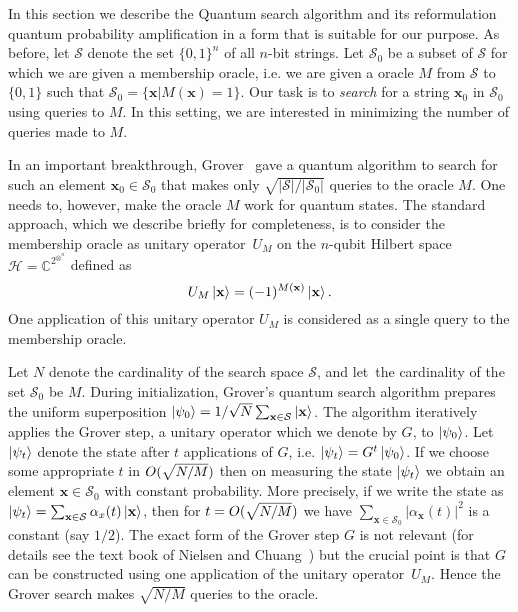 In this section we describe the Quantum search algorithm and its reformulation quantum probability amplification in a form that is suitable for our purpose. As before, let $\mathcal{S}$ denote the set $\{ 0, 1 \}^n$ of all $n$-bit strings. Let $\mathcal{S}_0$ be a subset of $\mathcal{S}$ for which we are given a membership oracle, i.e. we are given a oracle $M$ from $\mathcal{S}$ to $\{ 0 , 1 \}$ such that $\mathcal{S}_0 = \{ \mathbf{x} | M(\mathbf{x}) = 1 \}$. Our task is to \emph{search} for a string $\mathbf{x}_0$ in $\mathcal{S}_0$ using queries to $M$. In this setting, we are interested in minimizing the number of queries made to $M$.

In an important breakthrough, Grover~\cite{Grover96} gave a quantum algorithm to search for such an element $\mathbf{x}_0 \in \mathcal{S}_0$ that makes only $\sqrt{|\mathcal{S}|/|\mathcal{S}_0|}$ queries to the oracle $M$. One needs to, however, make the oracle $M$ work for quantum states. The standard approach, which we describe briefly for completeness, is to consider the membership oracle as unitary operator~$U_M$ on the $n$-qubit Hilbert space $\mathcal{H}= \mathbb{C}^{2^{\otimes^n}}$ defined as
\[
U_M \left\vert \mathbf{x} \right\rangle = (-1)^{M(\mathbf{x})} \left\vert \mathbf{x} \right\rangle.
\]
One application of this unitary operator $U_M$ is considered as a single query to the membership oracle.

Let $N$ denote the cardinality of the search space $\mathcal{S}$, and let~the cardinality of the set $\mathcal{S}_0$ be $M$. During initialization, Grover's quantum search algorithm prepares the uniform superposition $\left\vert \psi_0 \right\rangle= {1}/{\sqrt{N}}\sum_{\mathbf{x} \in \mathcal{S}}\left\vert \mathbf{x} \right\rangle$. The algorithm iteratively applies the Grover step, a unitary operator which we denote by $G$, to $\left\vert \psi_0 \right\rangle$.  Let $\left\vert \psi_t \right\rangle$ denote the state after $t$ applications of $G$, i.e. $\left\vert \psi_t \right\rangle = G^t \left\vert \psi_0 \right\rangle$. If we choose some appropriate $t$ in $ {O}(\sqrt{N/M})$ then on measuring the state $\left\vert \psi_t \right\rangle$ we obtain an element $\mathbf{x} \in \mathcal{S}_0$ with constant probability. More precisely, if we write the state as $\left\vert \psi_t \right\rangle = \sum_{\mathbf{x}\in \mathcal{S}} \alpha_x(t)\left\vert \mathbf{x} \right\rangle$, then for $t= {O}(\sqrt{N/M})$ we have $\sum_{\mathbf{x}\in\mathcal{S}_0} |\alpha_\mathbf{x}(t)|^2$ is a constant (say $1/2$). The exact form of the Grover step $G$ is not relevant (for details see the text book of Nielsen and Chuang~\cite[Chapter 6]{nielsenchuang:book}) but the crucial point is that $G$ can be constructed using one application of the unitary operator~$U_M$. Hence the Grover search makes $\sqrt{N/M}$ queries to the oracle.

